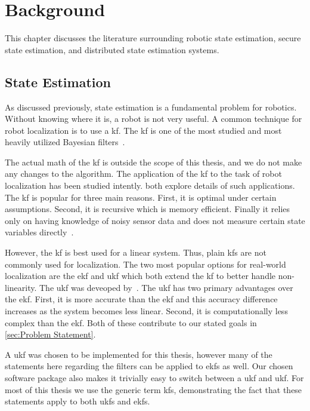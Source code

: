 \documentclass[thesis.tex]{subfile}
\begin{document}
\chapter{Background} \label{ch:Background}
This chapter discusses the literature surrounding robotic state estimation, secure state estimation, and distributed state estimation systems.

\section{State Estimation}
As discussed previously, state estimation is a fundamental problem for robotics. Without knowing where it is, a robot is not very useful. A common technique for robot localization is to use a \gls{kf}. The \gls{kf} is one of the most studied and most heavily utilized Bayesian filters~\cite[39-81]{ProbabilisticRobotics}. %

The actual math of the \gls{kf} is outside the scope of this thesis, and we do not make any changes to the algorithm. The application of the \gls{kf} to the task of robot localization has been studied intently. \textcite{Localization2003, Mohsin2014} both explore details of such applications. The \gls{kf} is popular for three main reasons. First, it is optimal under certain assumptions. Second, it is recursive which is memory efficient. Finally it relies only on having knowledge of noisy sensor data and does not measure certain state variables directly~\cite{Mohsin2014}.

However, the \gls{kf} is best used for a linear system. Thus, plain \glspl{kf} are not commonly used for localization. The two most popular options for real-world localization are the \gls{ekf} and \gls{ukf} which both extend the \gls{kf} to better handle non-linearity. The \gls{ukf} was deveoped by~\textcite{Julier1997}. The \gls{ukf} has two primary advantages over the \gls{ekf}. First, it is more accurate than the \gls{ekf} and this accuracy difference increases as the system becomes less linear. Second, it is computationally less complex than the \gls{ekf}. Both of these contribute to our stated goals in \cref{sec:Problem Statement}.

A \gls{ukf} was chosen to be implemented for this thesis, however many of the statements here regarding the filters can be applied to \glspl{ekf} as well. Our chosen software package also makes it trivially easy to switch between a \gls{ukf} and \gls{ukf}. For most of this thesis we use the generic term \glspl{kf}, demonstrating the fact that these statements apply to both \glspl{ukf} and \glspl{ekf}.
\end{document}
